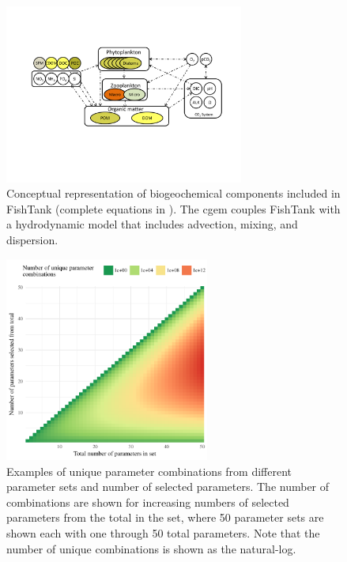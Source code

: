 \documentclass[review]{elsarticle}\usepackage[]{graphicx}\usepackage[]{color}
\begin{document}
\begin{figure}
\centering
\includegraphics[width=0.7\textwidth]{figs/fishmod.pdf}
\caption{Conceptual representation of biogeochemical components included in FishTank (complete equations in \citealt{Eldridge10}). The \acl{cgem} couples FishTank with a hydrodynamic model that includes advection, mixing, and dispersion.}
\label{fig:mod_schem}
\end{figure}

\begin{figure}[!ht]

{\centering \includegraphics[width=0.6\textwidth]{figs/combnex-1} 

}

\caption[Examples of unique parameter combinations from different parameter sets and number of selected parameters]{Examples of unique parameter combinations from different parameter sets and number of selected parameters.  The number of combinations are shown for increasing numbers of selected parameters from the total in the set, where 50 parameter sets are shown each with one through 50 total parameters. Note that the number of unique combinations is shown as the natural-log.}\label{fig:combnex}
\end{figure}
\end{document}
